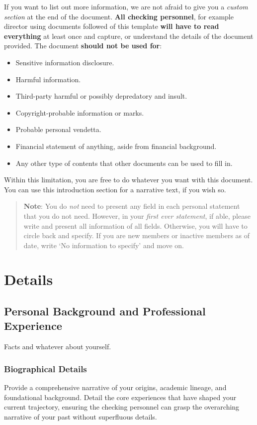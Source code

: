 \documentclass[10pt,a4paper]{article}
\begin{document}
If you want to list out more information, we are not afraid to give you a \textit{custom section} at the end of the document. \textbf{All checking personnel}, for example director using documents followed of this template \textbf{will have to read everything} at least once and capture, or understand the details of the document provided. The document \textbf{should not be used for}: 
\begin{itemize}
    \item Sensitive information disclosure. 
    \item Harmful information. 
    \item Third-party harmful or possibly depredatory and insult. 
    \item Copyright-probable information or marks. 
    \item Probable personal vendetta. 
    \item Financial statement of anything, aside from financial background. 
    \item Any other type of contents that other documents can be used to fill in. 
\end{itemize}
Within this limitation, you are free to do whatever you want with this document. You can use this introduction section for a narrative text, if you wish so. 

\begin{quote}
    \textbf{Note}: You do \textit{not} need to present any field in each personal statement that you do not need. However, in your \textit{first ever statement}, if able, please write and present all information of all fields. Otherwise, you will have to circle back and specify. If you are new members or inactive members as of date, write `No information to specify' and move on. 
\end{quote}
\section{Details}

\subsection{Personal Background and Professional Experience}

Facts and whatever about yourself. 

\subsubsection{Biographical Details}
Provide a comprehensive narrative of your origins, academic lineage, and foundational background. Detail the core experiences that have shaped your current trajectory, ensuring the checking personnel can grasp the overarching narrative of your past without superfluous details.
\end{document}
